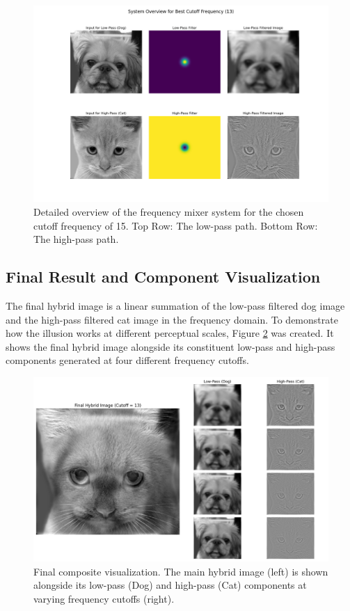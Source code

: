 \documentclass[11pt, a4paper]{article}
\begin{document}
\begin{figure}[H]
    \centering
    \includegraphics[width=\textwidth]{q1_part3_system_overview.png}
    \caption{Detailed overview of the frequency mixer system for the chosen cutoff frequency of 15. Top Row: The low-pass path. Bottom Row: The high-pass path.}
    \label{fig:overview}
\end{figure}

\subsection{Final Result and Component Visualization}
The final hybrid image is a linear summation of the low-pass filtered dog image and the high-pass filtered cat image in the frequency domain. To demonstrate how the illusion works at different perceptual scales, Figure \ref{fig:composite} was created. It shows the final hybrid image alongside its constituent low-pass and high-pass components generated at four different frequency cutoffs.

\begin{figure}[H]
    \centering
    \includegraphics[width=\textwidth]{q1_part3_composite_visualization.png}
    \caption{Final composite visualization. The main hybrid image (left) is shown alongside its low-pass (Dog) and high-pass (Cat) components at varying frequency cutoffs (right).}
    \label{fig:composite}
\end{figure}
\end{document}
